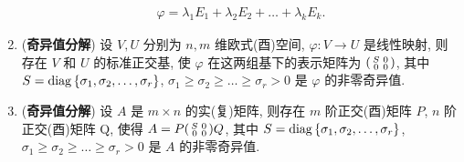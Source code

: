 \documentclass{ctexart}
\let\set\qty
\let\emph\textbf
\let\ge\geqslant
\DeclareMathOperator{\diag}{diag}
\begin{document}
\begin{tcolorbox}[title={矩阵/线性算子分解}]
\begin{enumerate}[resume=exer]
\begin{align*}
                \varphi = \lambda_{1}E_{1} + \lambda_{2}E_{2} + \dots + \lambda_{k}E_{k}.
            \end{align*}
            \item (\emph{奇异值分解}) 设 $ V, U $ 分别为 $ n, m $ 维欧式(酉)空间, $ \varphi : V \to U $ 是线性映射, 则存在 $ V $ 和 $ U $ 的标准正交基, 使 $ \varphi $ 在这两组基下的表示矩阵为 $ \smqty(S & 0 \\ 0 & 0) $, 其中 $ S = \diag\set{\sigma_{1}, \sigma_{2}, \dots, \sigma_{r}} $, $ \sigma_{1} \ge \sigma_{2} \ge \dots \ge \sigma_{r} > 0 $ 是 $ \varphi $ 的非零奇异值.
            \item (\emph{奇异值分解}) 设 $ A $ 是 $ m\times n $ 的实(复)矩阵, 则存在 $ m $ 阶正交(酉)矩阵 $ P $, $ n $ 阶正交(酉)矩阵 Q, 使得 $ A = P\smqty(S & 0 \\ 0 & 0)Q $, 其中 $ S = \diag\set{\sigma_{1}, \sigma_{2}, \dots, \sigma_{r}} $, $ \sigma_{1} \ge \sigma_{2} \ge \dots \ge \sigma_{r} > 0 $ 是 $ A $ 的非零奇异值.
        \end{enumerate}
    \end{tcolorbox}
\end{document}
